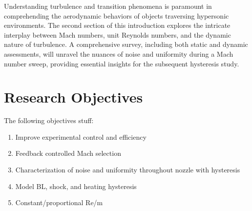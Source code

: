 Understanding turbulence and transition phenomena is paramount in comprehending the aerodynamic behaviors of objects traversing hypersonic environments. The second section of this introduction explores the intricate interplay between Mach numbers, unit Reynolds numbers, and the dynamic nature of turbulence. A comprehensive survey, including both static and dynamic assessments, will unravel the nuances of noise and uniformity during a Mach number sweep, providing essential insights for the subsequent hysteresis study.

\section{Research Objectives}

The following objectives stuff:

\begin{enumerate}
    \item Improve experimental control and efficiency
    \item Feedback controlled Mach selection
    \item Characterization of noise and uniformity throughout nozzle with hysteresis
    \item Model BL, shock, and heating hysteresis
    \item Constant/proportional Re/m
\end{enumerate}
